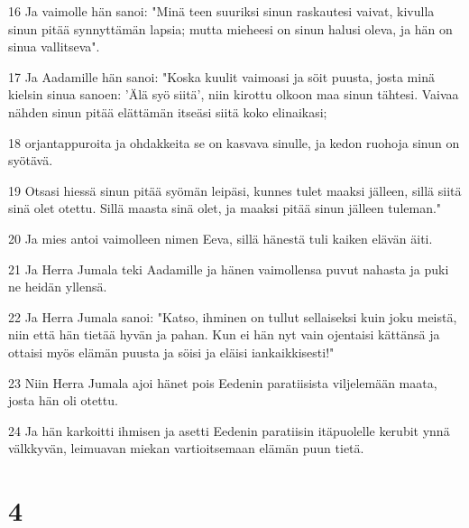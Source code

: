 \par 16 Ja vaimolle hän sanoi: "Minä teen suuriksi sinun raskautesi vaivat, kivulla sinun pitää synnyttämän lapsia; mutta mieheesi on sinun halusi oleva, ja hän on sinua vallitseva".
\par 17 Ja Aadamille hän sanoi: "Koska kuulit vaimoasi ja söit puusta, josta minä kielsin sinua sanoen: 'Älä syö siitä', niin kirottu olkoon maa sinun tähtesi. Vaivaa nähden sinun pitää elättämän itseäsi siitä koko elinaikasi;
\par 18 orjantappuroita ja ohdakkeita se on kasvava sinulle, ja kedon ruohoja sinun on syötävä.
\par 19 Otsasi hiessä sinun pitää syömän leipäsi, kunnes tulet maaksi jälleen, sillä siitä sinä olet otettu. Sillä maasta sinä olet, ja maaksi pitää sinun jälleen tuleman."
\par 20 Ja mies antoi vaimolleen nimen Eeva, sillä hänestä tuli kaiken elävän äiti.
\par 21 Ja Herra Jumala teki Aadamille ja hänen vaimollensa puvut nahasta ja puki ne heidän yllensä.
\par 22 Ja Herra Jumala sanoi: "Katso, ihminen on tullut sellaiseksi kuin joku meistä, niin että hän tietää hyvän ja pahan. Kun ei hän nyt vain ojentaisi kättänsä ja ottaisi myös elämän puusta ja söisi ja eläisi iankaikkisesti!"
\par 23 Niin Herra Jumala ajoi hänet pois Eedenin paratiisista viljelemään maata, josta hän oli otettu.
\par 24 Ja hän karkoitti ihmisen ja asetti Eedenin paratiisin itäpuolelle kerubit ynnä välkkyvän, leimuavan miekan vartioitsemaan elämän puun tietä.

\chapter{4}


